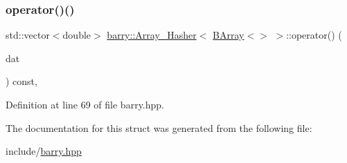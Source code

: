 \subsubsection{\texorpdfstring{operator()()}{operator()()}}
{\footnotesize\ttfamily std\+::vector$<$double$>$ \hyperlink{structbarry_1_1_array___hasher}{barry\+::\+Array\+\_\+\+Hasher}$<$ \hyperlink{classbarry_1_1_b_array}{B\+Array}$<$$>$ $>$\+::operator() (\begin{DoxyParamCaption}\item[{\hyperlink{classbarry_1_1_b_array}{B\+Array}$<$$>$ const \&}]{dat }\end{DoxyParamCaption}) const\hspace{0.3cm}{\ttfamily [inline]}, {\ttfamily [noexcept]}}



Definition at line 69 of file barry.\+hpp.



The documentation for this struct was generated from the following file\+:\begin{DoxyCompactItemize}
\item 
include/\hyperlink{barry_8hpp}{barry.\+hpp}\end{DoxyCompactItemize}
